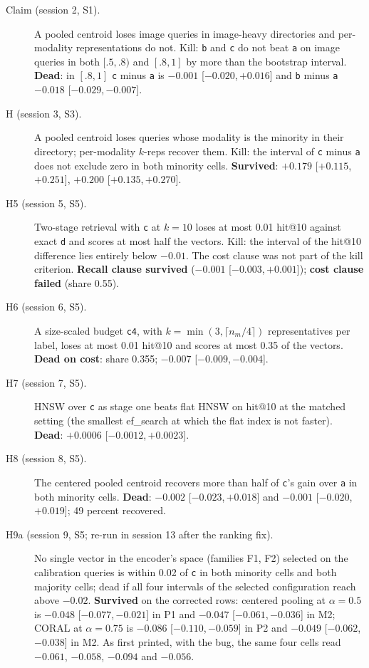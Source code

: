 \documentclass[11pt]{article}
\newcommand{\rep}[1]{\texttt{#1}}
\newcommand{\ci}[2]{[\ensuremath{#1},\,\ensuremath{#2}]}  %
\begin{document}
\begin{description}
\item[Claim (session 2, S1).] A pooled centroid loses image queries in image-heavy directories and per-modality representations do not. Kill: \rep{b} and \rep{c} do not beat \rep{a} on image queries in both $[.5,.8)$ and $[.8,1]$ by more than the bootstrap interval. \textbf{Dead}: in $[.8,1]$ \rep{c} minus \rep{a} is $-0.001$ \ci{-0.020}{+0.016} and \rep{b} minus \rep{a} $-0.018$ \ci{-0.029}{-0.007}.
\item[H (session 3, S3).] A pooled centroid loses queries whose modality is the minority in their directory; per-modality $k$-reps recover them. Kill: the interval of \rep{c} minus \rep{a} does not exclude zero in both minority cells. \textbf{Survived}: $+0.179$ \ci{+0.115}{+0.251}, $+0.200$ \ci{+0.135}{+0.270}.
\item[H5 (session 5, S5).] Two-stage retrieval with \rep{c} at $k = 10$ loses at most 0.01 hit@10 against exact \rep{d} and scores at most half the vectors. Kill: the interval of the hit@10 difference lies entirely below $-0.01$. The cost clause was not part of the kill criterion. \textbf{Recall clause survived} ($-0.001$ \ci{-0.003}{+0.001}); \textbf{cost clause failed} (share 0.55).
\item[H6 (session 6, S5).] A size-scaled budget \rep{c4}, with $k = \min(3, \lceil n_m / 4 \rceil)$ representatives per label, loses at most 0.01 hit@10 and scores at most 0.35 of the vectors. \textbf{Dead on cost}: share 0.355; $-0.007$ \ci{-0.009}{-0.004}.
\item[H7 (session 7, S5).] HNSW over \rep{c} as stage one beats flat HNSW on hit@10 at the matched setting (the smallest ef\_search at which the flat index is not faster). \textbf{Dead}: $+0.0006$ \ci{-0.0012}{+0.0023}.
\item[H8 (session 8, S5).] The centered pooled centroid recovers more than half of \rep{c}'s gain over \rep{a} in both minority cells. \textbf{Dead}: $-0.002$ \ci{-0.023}{+0.018} and $-0.001$ \ci{-0.020}{+0.019}; 49 percent recovered.
\item[H9a (session 9, S5; re-run in session 13 after the ranking fix).] No single vector in the encoder's space (families F1, F2) selected on the calibration queries is within 0.02 of \rep{c} in both minority cells and both majority cells; dead if all four intervals of the selected configuration reach above $-0.02$. \textbf{Survived} on the corrected rows: centered pooling at $\alpha = 0.5$ is $-0.048$ \ci{-0.077}{-0.021} in P1 and $-0.047$ \ci{-0.061}{-0.036} in M2; CORAL at $\alpha = 0.75$ is $-0.086$ \ci{-0.110}{-0.059} in P2 and $-0.049$ \ci{-0.062}{-0.038} in M2. As first printed, with the bug, the same four cells read $-0.061$, $-0.058$, $-0.094$ and $-0.056$.

\end{description}
\end{document}
